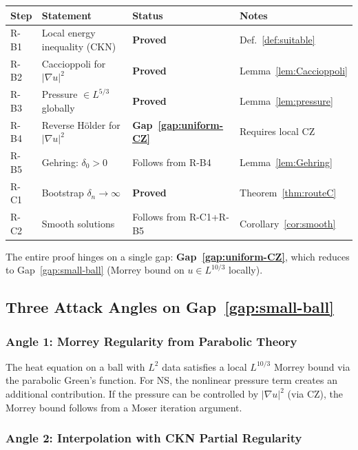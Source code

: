 \documentclass[11pt]{article}
\theoremstyle{definition}
\theoremstyle{remark}
\newcommand{\grad}{\nabla}
\begin{document}
\begin{center}
\begin{tabular}{@{}llll@{}}
\toprule
Step & Statement & Status & Notes \\
\midrule
R-B1 & Local energy inequality (CKN) & \textbf{Proved} & Def.~\ref{def:suitable} \\
R-B2 & Caccioppoli for $|\grad u|^2$ & \textbf{Proved} & Lemma~\ref{lem:Caccioppoli} \\
R-B3 & Pressure $\in L^{5/3}$ globally & \textbf{Proved} & Lemma~\ref{lem:pressure} \\
R-B4 & Reverse H\"older for $|\grad u|^2$ & \textbf{Gap~\ref{gap:uniform-CZ}} & Requires local CZ \\
R-B5 & Gehring: $\delta_0>0$ & Follows from R-B4 & Lemma~\ref{lem:Gehring} \\
\midrule
R-C1 & Bootstrap $\delta_n\to\infty$ & \textbf{Proved} & Theorem~\ref{thm:routeC} \\
R-C2 & Smooth solutions & Follows from R-C1+R-B5 & Corollary~\ref{cor:smooth} \\
\bottomrule
\end{tabular}
\end{center}

The entire proof hinges on a single gap: \textbf{Gap~\ref{gap:uniform-CZ}},
which reduces to Gap~\ref{gap:small-ball} (Morrey bound on $u\in L^{10/3}$
locally).

\subsection{Three Attack Angles on Gap~\ref{gap:small-ball}}

\subsubsection{Angle 1: Morrey Regularity from Parabolic Theory}

The heat equation on a ball with $L^2$ data satisfies a local $L^{10/3}$
Morrey bound via the parabolic Green's function.  For NS, the nonlinear
pressure term creates an additional contribution.  If the pressure can be
controlled by $|\grad u|^2$ (via CZ), the Morrey bound follows from a
Moser iteration argument.

\subsubsection{Angle 2: Interpolation with CKN Partial Regularity}
\end{document}
